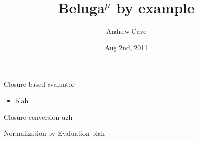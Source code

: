 \documentclass{beamer}
\title[]{Beluga$^\mu$ by example}
\author{Andrew Cave}
\date{Aug 2nd, 2011}
\begin{document}
\begin{frame}
\titlepage
\end{frame}

\begin{frame}[fragile]{Closure based evaluator}
\begin{itemize}
\item blah
\end{itemize}
\end{frame}

\begin{frame}[fragile]{Closure conversion}
ugh
\end{frame}

\begin{frame}[fragile]{Normalization by Evaluation}
blah
\end{frame}
\end{document}
